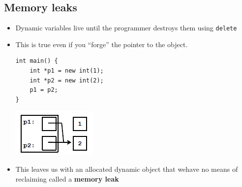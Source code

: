 \subsection{Memory leaks}
\begin{itemize}
	\item Dynamic variables live until the programmer destroys them using \lstinline[style=C++]{delete}
	\item This is true even if you ``forge'' the pointer to the object.
\begin{lstlisting}[style=C++]
int main() {
	int *p1 = new int(1);
	int *p2 = new int(2);
	p1 = p2;
}
\end{lstlisting}
	\begin{center}
		\includegraphics{sections/lec15/mem1.png}
	\end{center}
	\item This leaves us with an allocated dynamic object that wehave no means of reclaiming called a \textbf{memory leak}
\end{itemize}

